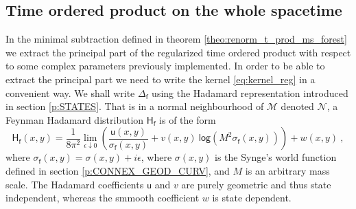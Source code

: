 \documentclass[11pt]{book}
\renewcommand{\log}{\mathsf{log}}
\newcommand{\Mcal}{\mathcal{M}}
\newcommand{\Ncal}{\mathcal{N}}
\newcommand{\Hsf}{\mathsf{H}}
\newcommand{\fsf}{\mathsf{f}}
\newcommand{\usf}{\mathsf{u}}
\theoremstyle{break}
\begin{document}
\subsection{Time ordered product on the whole spacetime}
\label{p:GLOB_TPROD}


In the minimal subtraction defined in theorem \ref{theo:renorm_t_prod_ms_forest} we extract the principal part of the regularized time ordered product with respect to some complex parameters previously implemented. In order to be able to extract the principal part we need to write the kernel \eqref{eq:kernel_reg} in a convenient way. We shall write $\Delta_\fsf$ using the Hadamard representation introduced in section \ref{p:STATES}. That is in a normal neighbourhood of $\Mcal$ denoted $\Ncal$, a Feynman Hadamard distribution $\Hsf_\fsf$ is of the form
%
\begin{equation}
\Hsf_\fsf(x,y) = \frac{1}{8\pi^2}  \lim_{\epsilon \downarrow 0} \left( \frac{\usf(x,y)}{\sigma_\fsf(x,y)} + v(x,y) \ \log\left( M^2 \sigma_\fsf(x,y)\right) \right) + w(x,y) \ ,
\label{eq:hadamard_rep} 
\end{equation}
%
where $\sigma_\fsf(x,y) = \sigma(x,y) + i \epsilon$, where $\sigma(x,y)$ is the Synge's world function defined in section \ref{p:CONNEX_GEOD_CURV}, and $M$ is an arbitrary mass scale. The Hadamard coefficients $\usf$ and $v$ are purely geometric and thus state independent, whereas the smmooth coefficient $w$ is state dependent.
\end{document}
